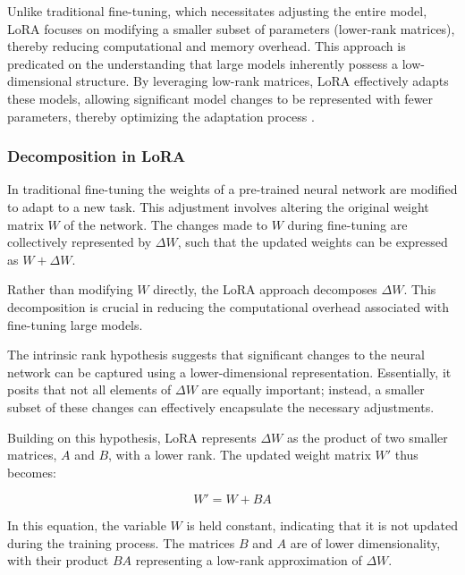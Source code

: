 Unlike traditional fine-tuning, which necessitates adjusting the entire model, LoRA focuses on modifying a smaller subset of parameters (lower-rank matrices), thereby reducing computational and memory overhead. This approach is predicated on the understanding that large models inherently possess a low-dimensional structure. By leveraging low-rank matrices, LoRA effectively adapts these models, allowing significant model changes to be represented with fewer parameters, thereby optimizing the adaptation process \cite{hu2021lora}.

\subsubsection{Decomposition in LoRA}

In traditional fine-tuning the weights of a pre-trained neural network are modified to adapt to a new task. This adjustment involves altering the original weight matrix \( W \) of the network. The changes made to \( W \) during fine-tuning are collectively represented by \( \Delta W \), such that the updated weights can be expressed as \( W + \Delta W \).

Rather than modifying \( W \) directly, the LoRA approach decomposes \( \Delta W \). This decomposition is crucial in reducing the computational overhead associated with fine-tuning large models.

The intrinsic rank hypothesis suggests that significant changes to the neural network can be captured using a lower-dimensional representation. Essentially, it posits that not all elements of \( \Delta W \) are equally important; instead, a smaller subset of these changes can effectively encapsulate the necessary adjustments.

Building on this hypothesis, LoRA represents \( \Delta W \) as the product of two smaller matrices, \( A \) and \( B \), with a lower rank. The updated weight matrix \( W' \) thus becomes:

\begin{equation}
    W' = W + BA
\end{equation}

In this equation, the variable \( W \) is held constant, indicating that it is not updated during the training process. The matrices \( B \) and \( A \) are of lower dimensionality, with their product \( BA \) representing a low-rank approximation of \( \Delta W \).

